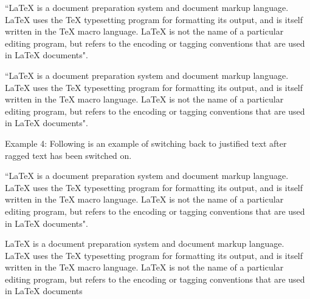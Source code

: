 \documentclass{article}
\begin{document}
\vspace{2em} %


\begin{flushleft}
``LaTeX is a document preparation system and document markup language. LaTeX uses the TeX typesetting program for formatting its output, and is itself written in the TeX macro language. LaTeX is not the name of a particular editing program, but refers to the encoding or tagging conventions that are used in LaTeX documents".
\end{flushleft}

\vspace{2em} %

\begin{flushright}
``LaTeX is a document preparation system and document markup language. LaTeX uses the TeX typesetting program for formatting its output, and is itself written in the TeX macro language. LaTeX is not the name of a particular editing program, but refers to the encoding or tagging conventions that are used in LaTeX documents".
\end{flushright}

\vspace{2em} %

\raggedright
Example 4: Following is an example of switching back to justified text after ragged text has been switched on.

\vspace{1em} %


\justifying
``LaTeX is a document preparation system and document markup language. LaTeX uses the TeX typesetting program for formatting its output, and is itself written in the TeX macro language. LaTeX is not the name of a particular editing program, but refers to the encoding or tagging conventions 
that are used in LaTeX documents".

\vspace{2em}

\newpage
LaTeX is a document preparation system and document markup language. \\  LaTeX uses the TeX typesetting \hspace{2cm} program for formatting its output, and is itself written in the TeX macro language. LaTeX \vspace{1cm} is not the name of a particular editing program, but refers to the encoding or tagging conventions that are used in LaTeX documents
\end{document}
